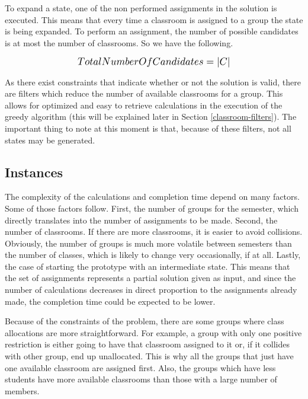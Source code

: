 To expand a state, one of the non performed assignments in the solution is executed. This means that every time a classroom is assigned to a group the state is being expanded. To perform an assignment, the number of possible candidates is at most the number of classrooms. So we have the following.

\begin{equation}
    \scalebox{1.2}{$TotalNumberOfCandidates = \left|C\right|$}
\end{equation}

As there exist constraints that indicate whether or not the solution is valid, there are filters which reduce the number of available classrooms for a group. This allows for optimized and easy to retrieve calculations in the execution of the greedy algorithm (this will be explained later in Section \ref{classroom-filters}). The important thing to note at this moment is that, because of these filters, not all states may be generated.

\subsection{Instances}

The complexity of the calculations and completion time depend on many factors. Some of those factors follow. First, the number of groups for the semester, which directly translates into the number of assignments to be made. Second, the number of classrooms. If there are more classrooms, it is easier to avoid collisions. Obviously, the number of groups is much more volatile between semesters than the number of classes, which is likely to change very occasionally, if at all. Lastly, the case of starting the prototype with an intermediate state. This means that the set of assignments represents a partial solution given as input, and since the number of calculations decreases in direct proportion to the assignments already made, the completion time could be expected to be lower.

Because of the constraints of the problem, there are some groups where class allocations are more straightforward. For example, a group with only one positive restriction is either going to have that classroom assigned to it or, if it collides with other group, end up unallocated. This is why all the groups that just have one available classroom are assigned first. Also, the groups which have less students have more available classrooms than those with a large number of members.



